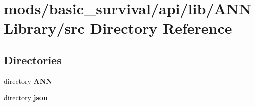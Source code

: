 \section{mods/basic\+\_\+survival/api/lib/\+A\+N\+N\+Library/src Directory Reference}
\label{dir_998234f14d4d8f1194176b4bcde30949}
\subsection*{Directories}
\begin{DoxyCompactItemize}
\item 
directory {\bf A\+N\+N}
\item 
directory {\bf json}
\end{DoxyCompactItemize}
